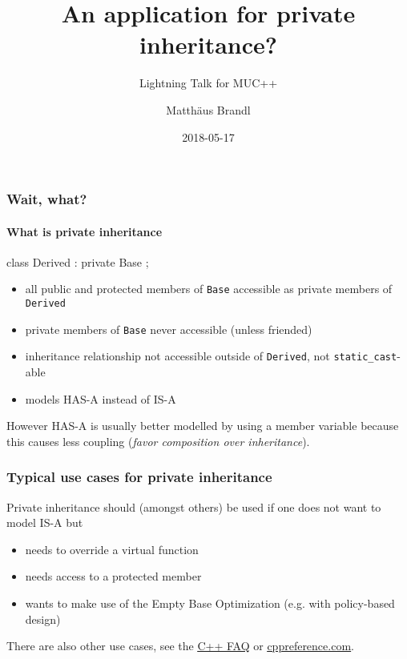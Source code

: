 \documentclass{beamer}
\title{An application for private inheritance?}
\subtitle{Lightning Talk for MUC++}
\author{Matth\"aus Brandl}
\date{2018-05-17}
\def\code#1{\texttt{#1}}
\def\link#1#2{\href{#1}{\usebeamercolor[fg]{structure} \underline{#2}}}
\begin{document}

\frame{\titlepage}


\begin{frame}[fragile]
\frametitle{Wait, what?}
\framesubtitle{What is private inheritance}

\begin{C++}
class Derived : private Base
{};
\end{C++}

\begin{itemize}
\item all public and protected members of \code{Base} accessible as private members of \code{Derived}
\item private members of \code{Base} never accessible (unless friended)
\pause 
\item inheritance relationship not accessible outside of \code{Derived}, not \code{static\_cast}-able
\pause
\item models HAS-A instead of IS-A
\end{itemize}
\pause

However HAS-A is usually better modelled by using a member variable because this causes less coupling (\textit{favor composition over inheritance}).
\end{frame}


\begin{frame}[fragile]
\frametitle{Typical use cases for private inheritance}
Private inheritance should (amongst others) be used if one does not want to model IS-A but
\begin{itemize}
\item needs to override a virtual function
\pause
\item needs access to a protected member
\pause
\item wants to make use of the Empty Base Optimization (e.g. with policy-based design)
\end{itemize}
\pause
There are also other use cases, see the \link{https://isocpp.org/wiki/faq/private-inheritance}{C++ FAQ} or \link{https://en.cppreference.com/w/cpp/language/derived_class\#Private_inheritance}{cppreference.com}.
\end{frame}

\end{document}
